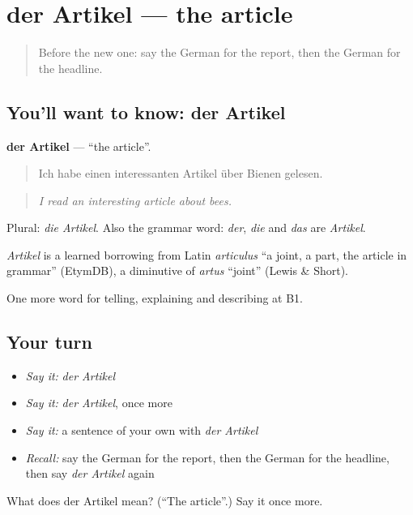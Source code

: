 \section[der Artikel]{der Artikel — the article}

\label{lesson:GE-C271-artikel}



\begin{quote}
Before the new one: say the German for the report, then the German for the headline.
\end{quote}

\subsection*{You'll want to know: der Artikel}
\textbf{der Artikel} — \textquotedblleft{}the article\textquotedblright{}.

\begin{quote}
Ich habe einen interessanten Artikel über Bienen gelesen.
\end{quote}

\begin{quote}
\emph{I read an interesting article about bees.}
\end{quote}

Plural: \emph{die Artikel}. Also the grammar word: \emph{der}, \emph{die} and \emph{das} are \emph{Artikel}.

\begin{cousinweb}
\emph{Artikel} is a learned borrowing from Latin \emph{articulus} \textquotedblleft{}a joint, a part, the article in grammar\textquotedblright{} (EtymDB), a diminutive of \emph{artus} \textquotedblleft{}joint\textquotedblright{} (Lewis \& Short).
\end{cousinweb}

\begin{grammarlens}[title={What you've built}]
One more word for telling, explaining and describing at B1.
\end{grammarlens}

\subsection*{Your turn}
\begin{itemize}
\raggedright
  \item \emph{Say it:} \emph{der Artikel}
  \item \emph{Say it:} \emph{der Artikel}, once more
  \item \emph{Say it:} a sentence of your own with \emph{der Artikel}
  \item \emph{Recall:} say the German for the report, then the German for the headline, then say \emph{der Artikel} again
\end{itemize}

\begin{tcolorbox}[breakable,colback=teal!4,colframe=teal!35!black,title={Before you move on}]
What does der Artikel mean? (\textquotedblleft{}The article\textquotedblright{}.) Say it once more.
\end{tcolorbox}
